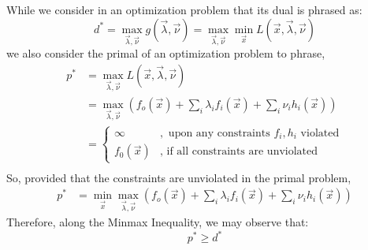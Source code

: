 While we consider in an optimization problem that its dual is phrased as:
\[
    d^* = \max_{\vec{\lambda}, \vec{\nu}} g(\vec{\lambda}, \vec{\nu}) = \max_{\vec{\lambda}, \vec{\nu}} \min_{\vec{x}} L(\vec{x}, \vec{\lambda}, \vec{\nu})
\]
we also consider the primal of an optimization problem to phrase,
\begin{align*}
    p^* &= \max_{\vec{\lambda}, \vec{\nu}} L(\vec{x}, \vec{\lambda}, \vec{\nu}) \\
    &= \max_{\vec{\lambda}, \vec{\nu}} (f_o(\vec{x}) + \sum_i \lambda_i f_i(\vec{x}) + \sum_i \nu_i h_i (\vec{x})) \\
    &= \begin{cases}
        \infty &,\text{ upon any constraints $f_i, h_i$ violated} \\
        f_0(\vec{x}) &,\text{ if all constraints are unviolated}
    \end{cases} \\
\end{align*}
So, provided that the constraints are unviolated in the primal problem,
\begin{align*}
    p^* &= \min_{\vec{x}} \max_{\vec{\lambda}, \vec{\nu}} (f_o(\vec{x}) + \sum_i \lambda_i f_i(\vec{x}) + \sum_i \nu_i h_i (\vec{x}))
\end{align*}
Therefore, along the Minmax Inequality, we may observe that:
\[
    p^* \geq d^*
\]
